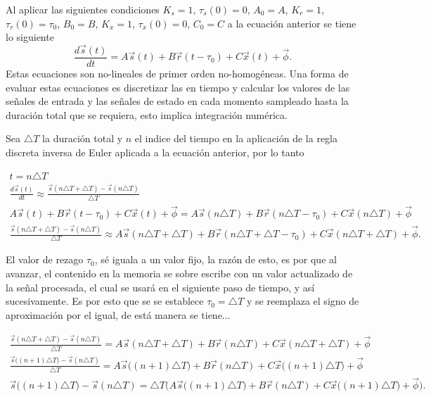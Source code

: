 \documentclass[12pt,letterpaper]{article}
\begin{document}
Al aplicar las siguientes condiciones  $K_s=1$, $\tau_s(0)=0$, $A_0 =A$, $K_r=1$, $\tau_r(0)=\tau_0$, $B_0=B$, $K_x=1$, $\tau_x(0)=0$, $C_0 = C$ a la ecuación anterior se tiene lo siguiente
\begin{equation}
    \frac{d\vec{s}(t)}{dt}=A\vec{s}(t)+B\vec{r}(t-\tau_0)+C\vec{x}(t)+\vec{\phi}.
\end{equation}
Estas ecuaciones son no-lineales de primer orden no-homogéneas. Una forma de evaluar estas ecuaciones es discretizar las en tiempo y calcular los valores de las señales de entrada y las señales de estado en cada momento sampleado hasta la duración total que se requiera, esto implica integración numérica. \cite{sherstinsky2020fundamentals}

Sea $\triangle T$ la duración total y $n$ el indice del tiempo en la aplicación de la regla discreta inversa de Euler aplicada a la ecuación anterior, por lo tanto

\begingroup
 \smaller
\begin{gather}
    t= n\triangle T\\
    \frac{d\vec{s}(t)}{dt}\approx \frac{\vec{s}(n\triangle T + \triangle T) - \vec{s}(n\triangle T)}{\triangle T}\\
     A\vec{s}(t)+B\vec{r}(t-\tau_0)+C\vec{x}(t)+\vec{\phi} = A\vec{s}(n\triangle T)+B\vec{r}(n\triangle T-\tau_0)+C\vec{x}(n\triangle T)+\vec{\phi}\\
    \frac{\vec{s}(n\triangle T + \triangle T )-\vec{s}(n \triangle T)}{\triangle T} \approx A\vec{s}(n\triangle T + \triangle T)+B\vec{r}(n\triangle T+ \triangle T -\tau_0)+C\vec{x}(n\triangle T+ \triangle T)+\vec{\phi}.
\end{gather}
\endgroup

El valor de rezago $\tau_0$, sé iguala a un valor fijo, la razón de esto, es por que al avanzar, el contenido en la memoria se sobre escribe con un valor actualizado de la señal procesada, el cual se usará en el siguiente paso de tiempo, y así sucesivamente. Es por esto que se se establece $\tau_0=\triangle T$ y se reemplaza el signo de aproximación por el igual, de está manera se tiene...

\begingroup
\smaller
\begin{gather}
    \frac{\vec{s}(n\triangle T + \triangle T )-\vec{s}(n \triangle T)}{\triangle T} = A\vec{s}(n\triangle T + \triangle T)+B\vec{r}(n\triangle T)+C\vec{x}(n\triangle T+ \triangle T)+\vec{\phi}\\
    \frac{\vec{s}\big((n+1)\triangle T \big)-\vec{s}(n \triangle T)}{\triangle T} = A\vec{s}\big( (n+1)\triangle T\big)+B\vec{r}(n\triangle T)+C\vec{x}\big( (n+1)\triangle T\big)+\vec{\phi}\\
    \vec{s}\big((n+1)\triangle T \big)-\vec{s}(n\triangle T) = \triangle T \bigg(A\vec{s}\big( (n+1)\triangle T\big)+B\vec{r}(n\triangle T)+C\vec{x}\big( (n+1)\triangle T\big)+\vec{\phi}\bigg).
\end{gather}
\endgroup
\end{document}
